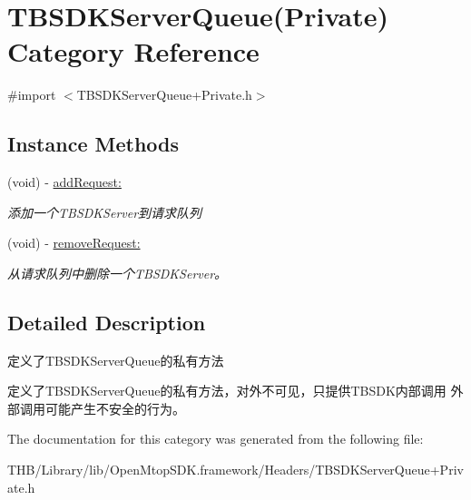 \hypertarget{category_t_b_s_d_k_server_queue_07_private_08}{}\section{T\+B\+S\+D\+K\+Server\+Queue(Private) Category Reference}
\label{category_t_b_s_d_k_server_queue_07_private_08}


{\ttfamily \#import $<$T\+B\+S\+D\+K\+Server\+Queue+\+Private.\+h$>$}

\subsection*{Instance Methods}
\begin{DoxyCompactItemize}
\item 
\mbox{\label{category_t_b_s_d_k_server_queue_07_private_08_a1f49ce0495f9d1b456b167e0b85168ab}} 
(void) -\/ \mbox{\hyperlink{category_t_b_s_d_k_server_queue_07_private_08_a1f49ce0495f9d1b456b167e0b85168ab}{add\+Request\+:}}
\begin{DoxyCompactList}\small\item\em 添加一个\+T\+B\+S\+D\+K\+Server到请求队列 \end{DoxyCompactList}\item 
\mbox{\label{category_t_b_s_d_k_server_queue_07_private_08_a9a49c2b4d5d7120147b66cb1f24a4902}} 
(void) -\/ \mbox{\hyperlink{category_t_b_s_d_k_server_queue_07_private_08_a9a49c2b4d5d7120147b66cb1f24a4902}{remove\+Request\+:}}
\begin{DoxyCompactList}\small\item\em 从请求队列中删除一个\+T\+B\+S\+D\+K\+Server。 \end{DoxyCompactList}\end{DoxyCompactItemize}


\subsection{Detailed Description}
定义了\+T\+B\+S\+D\+K\+Server\+Queue的私有方法

定义了\+T\+B\+S\+D\+K\+Server\+Queue的私有方法，对外不可见，只提供\+T\+B\+S\+D\+K内部调用 外部调用可能产生不安全的行为。 

The documentation for this category was generated from the following file\+:\begin{DoxyCompactItemize}
\item 
T\+H\+B/\+Library/lib/\+Open\+Mtop\+S\+D\+K.\+framework/\+Headers/T\+B\+S\+D\+K\+Server\+Queue+\+Private.\+h\end{DoxyCompactItemize}
